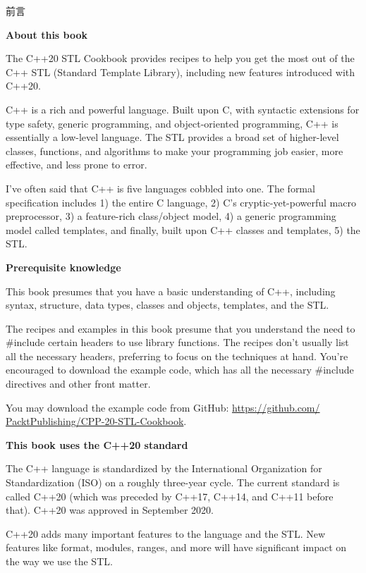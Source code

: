 \begin{flushright}
	 前言
\end{flushright}

\noindent
\textbf{About this book }

The C++20 STL Cookbook provides recipes to help you get the most out of the C++ STL (Standard Template Library), including new features introduced with C++20.

C++ is a rich and powerful language. Built upon C, with syntactic extensions for type safety, generic programming, and object-oriented programming, C++ is essentially a low-level language. The STL provides a broad set of higher-level classes, functions, and algorithms to make your programming job easier, more effective, and less prone to error.

I've often said that C++ is five languages cobbled into one. The formal specification includes 1) the entire C language, 2) C's cryptic-yet-powerful macro preprocessor, 3) a feature-rich class/object model, 4) a generic programming model called templates, and finally, built upon C++ classes and templates, 5) the STL.

\noindent
\textbf{Prerequisite knowledge}

This book presumes that you have a basic understanding of C++, including syntax, structure, data types, classes and objects, templates, and the STL.

The recipes and examples in this book presume that you understand the need to \#include certain headers to use library functions. The recipes don't usually list all the necessary headers, preferring to focus on the techniques at hand. You're encouraged to download the example code, which has all the necessary \#include directives and other front matter.

You may download the example code from GitHub: \url{https://github.com/ PacktPublishing/CPP-20-STL-Cookbook}.

\noindent
\textbf{This book uses the C++20 standard}

The C++ language is standardized by the International Organization for Standardization (ISO) on a roughly three-year cycle. The current standard is called C++20 (which was preceded by C++17, C++14, and C++11 before that). C++20 was approved in September 2020.

C++20 adds many important features to the language and the STL. New features like format, modules, ranges, and more will have significant impact on the way we use the STL.

